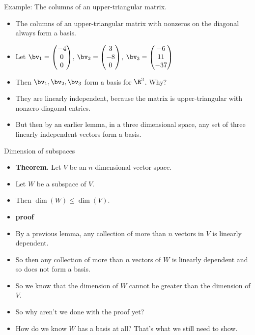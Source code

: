 \documentclass{beamer}
\begin{document}
\begin{frame}{Example: The columns of an upper-triangular matrix.}

\begin{itemize}
\item The columns of an upper-triangular matrix with nonzeros on the
diagonal always form a basis.
\item Let
$
\bv_1 =
\begin{pmatrix}
-4 \\ 0 \\ 0
\end{pmatrix}
$,
$
\bv_2 =
\begin{pmatrix}
3 \\ -8 \\ 0
\end{pmatrix}
$,
$
\bv_3 =
\begin{pmatrix}
-6 \\ 11 \\ -37
\end{pmatrix}
$
\item Then $\bv_1,\bv_2,\bv_3$ form a basis for $\R^3$. Why?
\item They are linearly independent, because the matrix is upper-triangular with nonzero diagonal entries.
\item But then by an earlier lemma, in a three dimensional space, any set of three linearly independent
vectors form a basis.
\end{itemize}

\end{frame}


\begin{frame}{Dimension of subspaces}

\begin{itemize}
\item \textbf{Theorem.} Let $V$ be an $n$-dimensional vector space.
\item Let $W$ be a subspace of $V$.
\item Then $\dim(W) \leq \dim(V)$.
\item \textbf{proof}
\item By a previous lemma, any collection of more than $n$ vectors in $V$ is linearly dependent.
\item So then any collection of more than $n$ vectors of $W$ is linearly dependent and so does not form a basis.
\item So we know that the dimension of $W$ cannot be greater than the dimension of $V$.
\item So why aren't we done with the proof yet?
\item How do we know $W$ has a basis at all? That's what we still need to show.
\end{itemize}
\end{frame}
\end{document}
